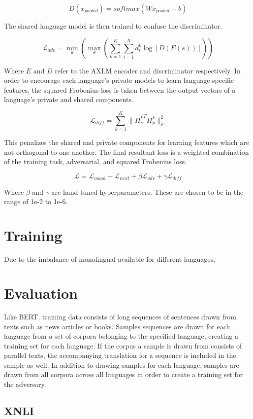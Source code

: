 \documentclass[12pt,letterpaper]{article}
\begin{document}
\begin{multicols}{2}
$$D(x_{pooled}) = softmax(W x_{pooled} + b)$$

The shared language model is then trained to confuse the discriminator.

$$\mathcal{L}_{adv} = \min_\theta \left( \max_\theta ( \sum_{k=1}^K \sum_{i=1}^N d_i^k \log [D(E(s))] ) \right)$$

Where $E$ and $D$ refer to the AXLM encoder and discriminator respectively.  In order to encourage each language's private models to learn language specific features, the squared Frobenius loss is taken between the output vectors of a language's private and shared components.

$$\mathcal{L}_{diff} = \sum_{k=1}^K \lVert {H_s^k}^T H_p^k \rVert_F^2$$

This penalizes the shared and private components for learning features which are not orthogonal to one another.  The final resultant loss is a weighted combination of the training task, adversarial, and squared Frobenius loss.

$$\mathcal{L} = \mathcal{L}_{mask} + \mathcal{L}_{next} + \beta \mathcal{L}_{adv} + \gamma \mathcal{L}_{diff}$$

Where $\beta$ and $\gamma$ are hand-tuned hyperparameters.  These are chosen to be in the range of 1e-2 to 1e-6.

\section{Training}
Due to the imbalance of monolingual available for different languages, 

\section{Evaluation}
Like BERT, training data consists of long sequences of sentences drawn from texts such as news articles or books.  Samples sequences are drawn for each language from a set of corpora belonging to the specified language, creating a training set for each language.  If the corpus a sample is drawn from consists of parallel texts, the accompanying translation for a sequence is included in the sample as well.  In addition to drawing samples for each language, samples are drawn from all corpora across all languages in order to create a training set for the adversary.

\subsection{XNLI}


\end{multicols}
\end{document}

